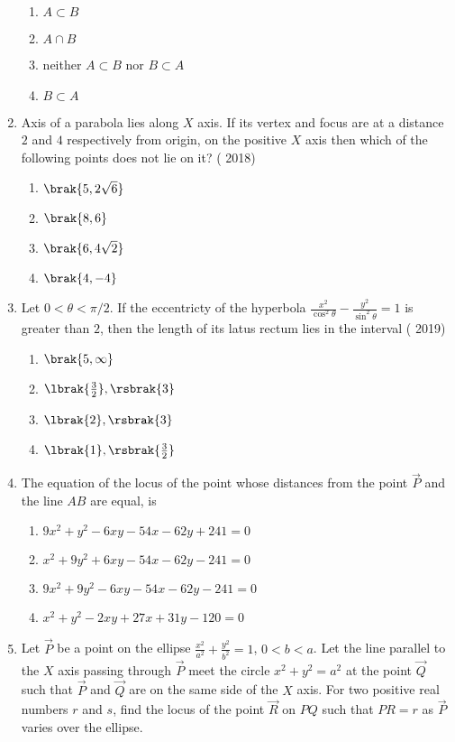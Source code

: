 \begin{enumerate}[label=\thesubsection.\arabic*.,ref=\thesubsection.\theenumi]
\begin{multicols}{2}
\begin{enumerate}
		\item $A\subset B$ 
		\item $A\cap B$
		\item neither $A\subset B$ nor $B\subset A$
		\item $B\subset A$
	\end{enumerate}\end{multicols}
\item Axis of a parabola lies along $X$ axis. If its vertex and focus are at a distance $2$ and $4$ respectively from origin, on the positive $X$ axis then which of the following points does not lie on it? 
     \hfill{( 2018)} 
				\begin{multicols}{4}
	\begin{enumerate}
    		\item $\brak{5,2\sqrt6}$
    		\item $\brak{8,6}$
    		\item $\brak{6,4\sqrt2}$
    		\item $\brak{4,-4}$
	\end{enumerate}\end{multicols}
\item Let $0<\theta<\pi/2$. If the eccentricty of the hyperbola $\frac{x^2}{\cos^2{\theta}} - \frac{y^2}{\sin^2{\theta}} = 1$ is greater than $2$, then the length of its latus rectum lies in the interval
	\hfill{( 2019)}
					\begin{multicols}{4}
	\begin{enumerate}
    		\item $\brak{5,\infty}$
    		\item $\lbrak{\frac{3}{2}},\rsbrak{3}$
    		\item $\lbrak{2},\rsbrak{3}$ 
    		\item $\lbrak{1},\rsbrak{\frac{3}{2}}$
	\end{enumerate} \end{multicols}
\item  The equation of the locus of the point whose distances from the point $\Vec{P}$ and the line $AB$ are equal, is

	\begin{multicols}{2}
\begin{enumerate}
     \item $9x^2+y^2-6xy-54x-62y+241=0$
     \item $x^2+9y^2+6xy-54x-62y-241=0$
     \item $9x^2+9y^2-6xy-54x-62y-241=0$
     \item $x^2+y^2-2xy+27x+31y-120=0$
\end{enumerate}\end{multicols}
\item Let $\vec{P}$ be a point on the ellipse $\frac{x^2}{a^2}+\frac{y^2}{b^2}=1$, $0<b<a$. Let the line parallel to the $X$ axis passing through $\vec{P}$ meet the circle $x^2+y^2=a^2$ at the point $\vec{Q}$ such that $\vec{P}$ and $\vec{Q}$ are on the same side of the $X$ axis. For two positive real numbers $r$ and $s$, find the locus of the point $\vec{R}$ on $PQ$ such that $PR
= r$ as $\vec{P}$ varies over the ellipse. \hfill{}



\end{enumerate}
